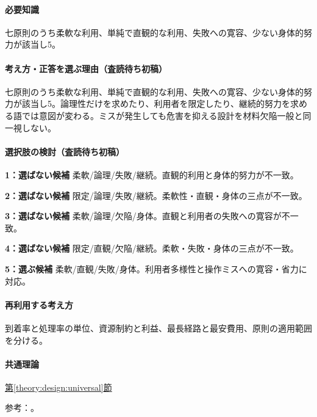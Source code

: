 \paragraph{必要知識} 七原則のうち柔軟な利用、単純で直観的な利用、失敗への寛容、少ない身体的努力が該当し5。

\paragraph{考え方・正答を選ぶ理由（査読待ち初稿）} 七原則のうち柔軟な利用、単純で直観的な利用、失敗への寛容、少ない身体的努力が該当し5。論理性だけを求めたり、利用者を限定したり、継続的努力を求める語では意図が変わる。ミスが発生しても危害を抑える設計を材料欠陥一般と同一視しない。

\paragraph{選択肢の検討（査読待ち初稿）}\mbox{}\par

\noindent\textbf{1：選ばない候補} 柔軟/論理/失敗/継続。直観的利用と身体的努力が不一致。\par

\noindent\textbf{2：選ばない候補} 限定/論理/失敗/継続。柔軟性・直観・身体の三点が不一致。\par

\noindent\textbf{3：選ばない候補} 柔軟/論理/欠陥/身体。直観と利用者の失敗への寛容が不一致。\par

\noindent\textbf{4：選ばない候補} 限定/直観/欠陥/継続。柔軟・失敗・身体の三点が不一致。\par

\noindent\textbf{5：選ぶ候補} 柔軟/直観/失敗/身体。利用者多様性と操作ミスへの寛容・省力に対応。\par

\paragraph{再利用する考え方} 到着率と処理率の単位、資源制約と利益、最長経路と最安費用、原則の適用範囲を分ける。

\paragraph{共通理論} \hyperref[theory:design:universal]{第\ref*{theory:design:universal}節}

\par 参考：\cite{design48_ud}。

